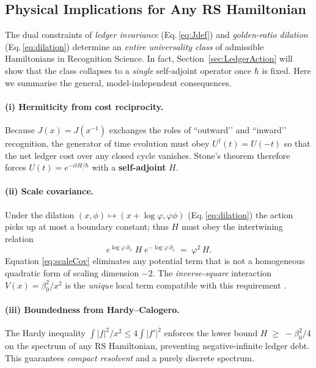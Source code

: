\documentclass[11pt]{article}
\begin{document}
\subsection{Physical Implications for Any RS Hamiltonian}
\label{sec:PhysImp}

The dual constraints of \emph{ledger invariance}
(Eq.\,\eqref{eq:Jdef}) and \emph{golden-ratio dilation}
(Eq.\,\eqref{eq:dilation}) determine an
\emph{entire universality class} of admissible Hamiltonians in
Recognition Science.  In fact, Section~\ref{sec:LedgerAction} will show
that the class collapses to a \emph{single} self-adjoint operator once
\(\hbar\) is fixed.  Here we summarise the general, model-independent
consequences.

\paragraph{(i) Hermiticity from cost reciprocity.}
Because $J(x)=J(x^{-1})$ exchanges the roles of
“outward’’ and “inward’’ recognition, the generator of time evolution
must obey
\(
   U^{\dagger}(t)=U(-t)
\)
so that the net ledger cost over any closed cycle vanishes.  Stone’s
theorem therefore forces
\(
   U(t)=e^{-itH/\hbar}
\)
with a \textbf{self-adjoint} $H$.

\paragraph{(ii) Scale covariance.}
Under the dilation $(x,\phi)\!\mapsto\!(x+\log\varphi,\varphi\phi)$
(Eq.\,\eqref{eq:dilation}) the action picks up at most a boundary
constant; thus $H$ must obey the intertwining relation
\begin{equation}
\label{eq:scaleCov}
   e^{\log\varphi\,\partial_{x}}\;H\;
   e^{-\log\varphi\,\partial_{x}}
   \;=\;
   \varphi^{2}\,H.
\end{equation}
Equation \eqref{eq:scaleCov} eliminates any potential term that is not
a homogeneous quadratic form of scaling dimension $-2$.  The
\emph{inverse-square} interaction
\(
   V(x)=\beta_{0}^{2}/x^{2}
\)
is the \emph{unique} local term compatible with this requirement
\cite[Lem.\,2]{WashburnLedgerUniqueness2025}.

\paragraph{(iii) Boundedness from Hardy--Calogero.}
The Hardy inequality
\(
   \int\!|f|^{2}/x^{2}\le4\int\!|f'|^{2}
\)
enforces the lower bound
\(
   H \;\ge\; -\beta_{0}^{2}/4
\)
on the spectrum of any RS Hamiltonian, preventing negative-infinite
ledger debt.  This guarantees \emph{compact resolvent} and a purely
discrete spectrum.
\end{document}
